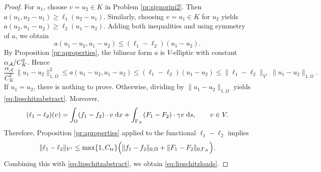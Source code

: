 \begin{proof}
	For $u_1$, choose $v=u_2\in K$ in Problem \ref{pr:signorini2}. Then $a(u_1,u_2-u_1)\ge \ell_1(u_2-u_1)$. Similarly, choosing $v=u_1\in K$ for $u_2$ yields $a(u_2,u_1-u_2)\ge \ell_2(u_1-u_2)$. Adding both inequalities and using symmetry of $a$, we obtain
	\begin{equation*}
		a(u_1-u_2,u_1-u_2)\le (\ell_1-\ell_2)(u_1-u_2).
	\end{equation*}
	By Proposition \ref{pr:aproperties}, the bilinear form $a$ is $V$-elliptic with constant $\alpha_{\mathcal A}/C_K^2$. Hence
	\begin{equation*}
		\frac{\alpha_\mathcal{A}}{C_K^2}\,\|u_1-u_2\|_{1,\Omega}^2
		\le a(u_1-u_2,u_1-u_2)
		\le (\ell_1-\ell_2)(u_1-u_2)
		\le \|\ell_1-\ell_2\|_{V'}\,\|u_1-u_2\|_{1,\Omega}.
	\end{equation*}
	If $u_1=u_2$, there is nothing to prove. Otherwise, dividing by $\|u_1-u_2\|_{1,\Omega}$ yields \eqref{eq:lipschitzabstract}. Moreover,
	\begin{equation*}
		(\ell_1-\ell_2)(v)
		=\int_\Omega (f_1-f_2)\cdot v\;{{\mathrm{d}} x}+\int_{\Gamma_N} (F_1-F_2)\cdot \gamma v\;{{\mathrm{d}} s},
		\qquad v\in V.
	\end{equation*}
	Therefore, Proposition \ref{pr:aproperties} applied to the functional $\ell_1-\ell_2$ implies
	\begin{equation*}
		\|\ell_1-\ell_2\|_{V'}
		\le \max\{1,C_\mathrm{tr}\}
		\Bigl(\|f_1-f_2\|_{0,\Omega}+\|F_1-F_2\|_{0,\Gamma_N}\Bigr).
	\end{equation*}
	Combining this with \eqref{eq:lipschitzabstract}, we obtain \eqref{eq:lipschitzloads}.
\end{proof}